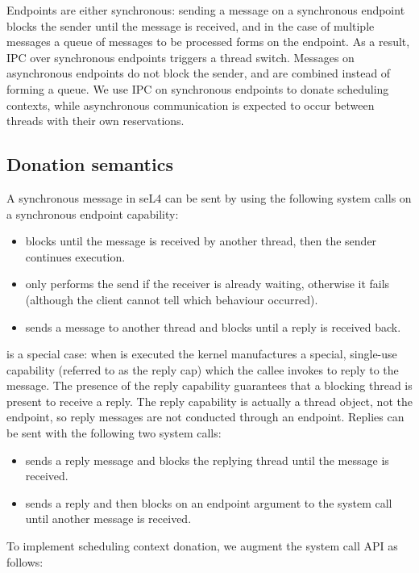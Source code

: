 Endpoints are either synchronous: sending a message on a synchronous endpoint blocks the sender until the message is received, and in the case of multiple messages a queue of messages to be processed forms on the endpoint.
As a result, IPC over synchronous endpoints triggers a thread switch.
Messages on asynchronous endpoints do not block the sender, and are combined instead of forming a queue.
We use IPC on synchronous endpoints to donate scheduling contexts, while asynchronous communication is expected to occur between threads with their own reservations.


\subsection{Donation semantics}

A synchronous message in seL4 can be sent by using the following system calls on a synchronous endpoint capability:

\begin{itemize}
	\item \send blocks until the message is received by another thread, then the sender continues execution.
	\item \nbsend only performs the send if the receiver is already waiting, otherwise it fails (although the client cannot tell which behaviour occurred).
	\item \call sends a message to another thread and blocks until a reply is received back.
\end{itemize}

\call is a special case: when \call is executed the kernel manufactures a special, single-use capability (referred to as the reply cap) which the callee invokes to reply to the message.
The presence of the reply capability guarantees that a blocking thread is present to receive a reply.
The reply capability is actually a thread object, not the endpoint, so reply messages are not conducted through an endpoint.
Replies can be sent with the following two system calls:

\begin{itemize}
	\item \reply sends a reply message and blocks the replying thread until the message is received.
	\item \replyrecv sends a reply and then blocks on an endpoint argument to the system call until another message is received.
\end{itemize}

To implement scheduling context donation, we augment the system call API as follows:

